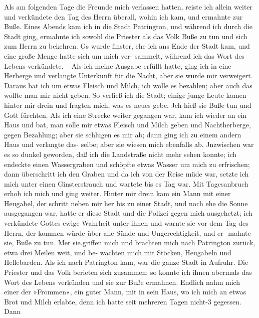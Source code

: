 Als am folgenden Tage die Freunde mich verlassen hatten,
reiste ich allein weiter und verkündete den Tag des Herrn überall,
wohin ich kam, und ermahnte zur Buße. Eines Abends kam ich
in die Stadt Patrington, und während ich durch die Stadt ging,
ermahnte ich sowohl die Priester als das Volk Buße zu tun und
sich zum Herrn zu bekehren. Gs wurde finster, ehe ich ans Ende
der Stadt kam, und eine große Menge hatte sich um mich ver-
sammelt, während ich das Wort des Lebens verkündete. -- Als
ich meine Ausgabe erfüllt hatte, ging ich in eine Herberge und
verlangte Unterkunft für die Nacht, aber sie wurde mir verweigert.
Daraus bat ich um etwas Fleisch und Milch, ich wolle es bezahlen;
aber auch das wollte man mir nicht geben. So verließ ich die
Stadt; einige junge Leute kamen hinter mir drein und fragten
mich, was es neues gebe. Jch hieß sie Buße tun und Gott
fürchten. Als ich eine Strecke weiter gegangen war, kam ich wieder
an ein Haus und bat, man solle mir etwas Fleisch und Milch
geben und Nachtherberge, gegen Bezahlung; aber sie schlugen es
mir ab; dann ging ich zu einem andern Haus und verlangte das-
selbe; aber sie wiesen mich ebenfalls ab. Jnzwischen war es so
dunkel geworden, daß ich die Landstraße nicht mehr sehen konnte;
ich endeckte einen Wassergraben und schöpfte etwas Wasser um
mich zu erfrischen; dann überschritt ich den Graben und da ich
von der Reise müde war, setzte ich mich unter einen Ginsterstrauch
und wartete bis es Tag war. Mit Tagesanbruch erhob ich mich
und ging weiter. Hinter mir drein kam ein Mann mit einer
Heugabel, der schritt neben mir her bis zu einer Stadt, und
noch ehe die Sonne ausgegangen war, hatte er diese Stadt und
die Polizei gegen mich ausgehetzt; ich verkündete Gottes ewige
Wahrheit unter ihnen und warnte sie vor dem Tag des Herrn,
der kommen würde über alle Sünde und Ungerechtigkeit, und er-
mahnte sie, Buße zu tun. Mer sie.griffen mich und brachten
mich nach Patrington zurück, etwa drei Meilen weit, und be-
wachten mich mit Stöcken, Heugabeln und Hellebarden. Als ich
nach Patrington kam, war die ganze Stadt in Aufruhr. Die
Priester und das Volk berieten sich zusammen; so konnte ich
ihnen abermals das Wort des Lebens verkünden und sie zur Buße
ermahnen. Endlich nahm mich einer der »Frommen«, ein guter
Mann, mit in sein Haus, wo ich mich an etwas Brot und Milch
erlabte, denn ich hatte seit mehreren Tagen nicht-3 gegessen. Dann



